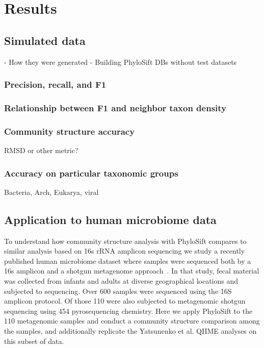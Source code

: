 \documentclass[10pt]{article}
\begin{document}
\section*{Results}



\subsection*{Simulated data}
    - How they were generated
    - Building PhyloSift DBs without test datasets
\subsubsection*{Precision, recall, and F1}
\subsubsection*{Relationship between F1 and neighbor taxon density}

\subsubsection*{Community structure accuracy}
RMSD or other metric?

\subsubsection*{Accuracy on particular taxonomic groups}
Bacteria, Arch, Eukarya, viral

\subsection*{Application to human microbiome data}

To understand how community structure analysis with PhyloSift compares to similar analysis based on 16s rRNA amplicon sequencing we study a recently published human microbiome dataset where samples were sequenced both by a 16s amplicon and a shotgun metagenome approach~\cite{Yatsunenko2012}.
In that study, fecal material was collected from infants and adults at diverse geographical locations and subjected to sequencing.
Over 600 samples were sequenced using the 16S amplicon protocol.
Of those 110 were also subjected to metagenomic shotgun sequencing using 454 pyrosequencing chemistry.
Here we apply PhyloSift to the 110 metagenomic samples and conduct a community structure comparison among the samples, and additionally replicate the Yatsunenko et al. QIIME analyses on this subset of data.
\end{document}
